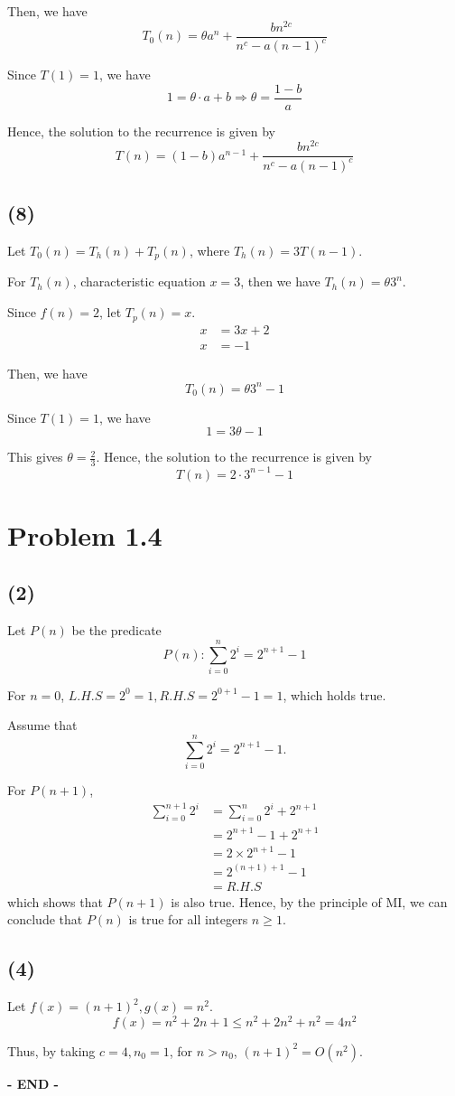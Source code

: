\documentclass[12pt]{article}
\begin{document}
Then, we have 
\[
  T_0(n) = \theta a^n + \dfrac{bn^{2c}}{n^c - a(n - 1)^c}
\]

Since \(T(1) = 1\), we have 
\[
  1 = \theta \cdot a + b \Longrightarrow \theta = \dfrac{1 - b}{a}
\]

Hence, the solution to the recurrence is given by 
\[
  T(n) = (1 - b)a^{n-1}  + \dfrac{bn^{2c}}{n^c - a(n - 1)^c}
\]

\subsection*{(8)}
Let \(T_0(n) = T_h(n) + T_p(n)\), where \(T_h(n) = 3T(n - 1)\). 

For \(T_h(n)\), characteristic equation \(x = 3\), then we have \(T_h(n) = \theta 3^n\). 

Since \(f(n) = 2\), let \(T_p(n) = x\). 
\[
  \begin{aligned}
    x &= 3x + 2 \\
    x &= -1
  \end{aligned}
\]

Then, we have 
\[
  T_0(n) = \theta 3^n - 1
\]

Since \(T(1) = 1\), we have 
\[
  1 = 3\theta - 1
\]

This gives \(\theta = \frac{2}{3}\). Hence, the solution to the recurrence is given by 
\[
  T(n) = 2 \cdot 3^{n-1}  - 1
\]

\section*{Problem 1.4}

\subsection*{(2)}
Let \(P(n)\) be the predicate 
\[
  P(n) : \sum_{i = 0}^n 2^i = 2^{n+1} - 1
\]

For \(n = 0\), \(L.H.S = 2^0 = 1, R.H.S = 2^{0+1} - 1 = 1\), which holds true. 

Assume that 
\[
\sum_{i = 0}^n 2^i = 2^{n+1} - 1. 
\]

For \(P(n + 1)\), 
\[
  \begin{aligned}
    \sum_{i = 0}^{n+1}  2^i &= \sum_{i = 0}^n 2^i + 2^{n+1} \\
    &= 2^{n+1} - 1 + 2^{n+1} \\
    &= 2 \times 2^{n+1} - 1\\
    &= 2^{(n+1)+1} - 1\\
    &= R.H.S
  \end{aligned}
\]
which shows that \(P(n + 1)\) is also true. 
Hence, by the principle of MI, we can conclude that \(P(n)\) is true for all integers \(n \geq 1\).

\subsection*{(4)}
Let \(f(x) = (n + 1)^2, g(x) = n^2\).
\[
  f(x) = n^2 + 2n + 1 \leq n^2 + 2n^2 + n^2 = 4n^{2}
\]

Thus, by taking \(c = 4, n_0 = 1\), for \(n > n_0\), \((n + 1)^2 = O(n^2)\). 

\vfill\centering\textbf{- END -}
\end{document}
